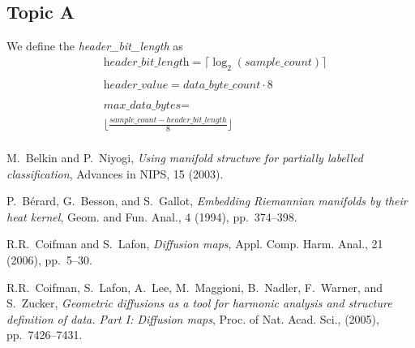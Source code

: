 \documentclass[a4paper,12pt]{article}
\begin{document}
\begin{multicols}{2}
\section{Topic A}
We define the \textit{header\_bit\_length} as 
\begin{align*}
&\textit{header\_bit\_length} = 
\lceil\log_2(\textit{sample\_count})\rceil \\ \\
&\textit{header\_value} = data\_byte\_count \cdot 8 \\ \\
&\textit{max\_data\_bytes} = \\
&\lfloor\frac{sample\_count - header\_bit\_length}{8}\rfloor \\
\end{align*}

\begin{thebibliography}{10}
M.~Belkin and P.~Niyogi, {\em Using manifold structure for partially
  labelled classification}, Advances in NIPS, 15 (2003).

P.~B\'erard, G.~Besson, and S.~Gallot, {\em Embedding {R}iemannian
  manifolds by their heat kernel}, Geom. and Fun. Anal., 4 (1994),
  pp.~374--398.

R.R.~Coifman and S.~Lafon, {\em Diffusion maps}, Appl. Comp. Harm. Anal.,
  21 (2006), pp.~5--30.

R.R.~Coifman, S.~Lafon, A.~Lee, M.~Maggioni, B.~Nadler, F.~Warner, and
  S.~Zucker, {\em Geometric diffusions as a tool for harmonic analysis and
  structure definition of data. {P}art {I}: Diffusion maps}, Proc. of Nat.
  Acad. Sci.,  (2005), pp.~7426--7431.

\end{thebibliography}

\end{multicols}
\end{document}
